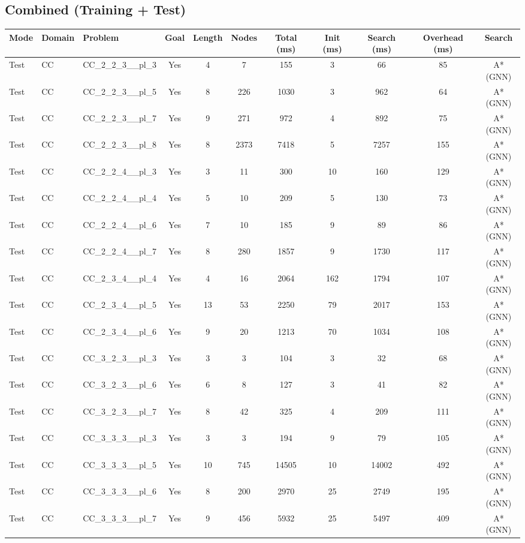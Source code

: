 \documentclass{article}
\begin{document}
\subsection*{Combined (Training + Test)}
\begin{tabular}{lllcccccccc}
\toprule
Mode & Domain & Problem & Goal & Length & Nodes & Total (ms) & Init (ms) & Search (ms) & Overhead (ms) & Search \\
\midrule
Test & CC & CC\_2\_2\_3\_\_pl\_3 & Yes & 4 & 7 & 155 & 3 & 66 & 85 & A*(GNN) \\
Test & CC & CC\_2\_2\_3\_\_pl\_5 & Yes & 8 & 226 & 1030 & 3 & 962 & 64 & A*(GNN) \\
Test & CC & CC\_2\_2\_3\_\_pl\_7 & Yes & 9 & 271 & 972 & 4 & 892 & 75 & A*(GNN) \\
Test & CC & CC\_2\_2\_3\_\_pl\_8 & Yes & 8 & 2373 & 7418 & 5 & 7257 & 155 & A*(GNN) \\
Test & CC & CC\_2\_2\_4\_\_pl\_3 & Yes & 3 & 11 & 300 & 10 & 160 & 129 & A*(GNN) \\
Test & CC & CC\_2\_2\_4\_\_pl\_4 & Yes & 5 & 10 & 209 & 5 & 130 & 73 & A*(GNN) \\
Test & CC & CC\_2\_2\_4\_\_pl\_6 & Yes & 7 & 10 & 185 & 9 & 89 & 86 & A*(GNN) \\
Test & CC & CC\_2\_2\_4\_\_pl\_7 & Yes & 8 & 280 & 1857 & 9 & 1730 & 117 & A*(GNN) \\
Test & CC & CC\_2\_3\_4\_\_pl\_4 & Yes & 4 & 16 & 2064 & 162 & 1794 & 107 & A*(GNN) \\
Test & CC & CC\_2\_3\_4\_\_pl\_5 & Yes & 13 & 53 & 2250 & 79 & 2017 & 153 & A*(GNN) \\
Test & CC & CC\_2\_3\_4\_\_pl\_6 & Yes & 9 & 20 & 1213 & 70 & 1034 & 108 & A*(GNN) \\
Test & CC & CC\_3\_2\_3\_\_pl\_3 & Yes & 3 & 3 & 104 & 3 & 32 & 68 & A*(GNN) \\
Test & CC & CC\_3\_2\_3\_\_pl\_6 & Yes & 6 & 8 & 127 & 3 & 41 & 82 & A*(GNN) \\
Test & CC & CC\_3\_2\_3\_\_pl\_7 & Yes & 8 & 42 & 325 & 4 & 209 & 111 & A*(GNN) \\
Test & CC & CC\_3\_3\_3\_\_pl\_3 & Yes & 3 & 3 & 194 & 9 & 79 & 105 & A*(GNN) \\
Test & CC & CC\_3\_3\_3\_\_pl\_5 & Yes & 10 & 745 & 14505 & 10 & 14002 & 492 & A*(GNN) \\
Test & CC & CC\_3\_3\_3\_\_pl\_6 & Yes & 8 & 200 & 2970 & 25 & 2749 & 195 & A*(GNN) \\
Test & CC & CC\_3\_3\_3\_\_pl\_7 & Yes & 9 & 456 & 5932 & 25 & 5497 & 409 & A*(GNN) \\

\end{tabular}
\end{document}

